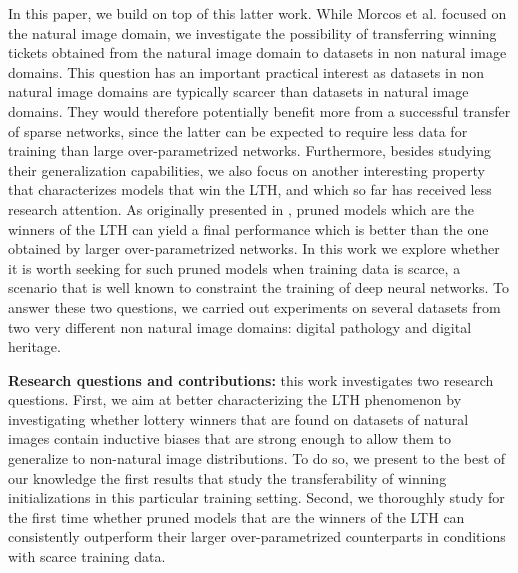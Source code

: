 In this paper, we build on top of this latter work. While Morcos et al. \cite{morcos2019one} focused on the natural image domain, we investigate the possibility of transferring winning tickets obtained from the natural image domain to datasets in non natural image domains. This question has an important practical interest as datasets in non natural image domains are typically scarcer than datasets in natural image domains. They would therefore potentially benefit more from a successful transfer of sparse networks, since the latter can be expected to require less data for training than large over-parametrized networks. Furthermore, besides studying their generalization capabilities, we also focus on another interesting property that characterizes models that win the LTH, and which so far has received less research attention. As originally presented in \cite{frankle2018lottery}, pruned models which are the winners of the LTH can yield a final performance which is better than the one obtained by larger over-parametrized networks. In this work we explore whether it is worth seeking for such pruned models when training data is scarce, a scenario that is well known to constraint the training of deep neural networks. To answer these two questions, we carried out experiments on several datasets from two very different non natural image domains: digital pathology and digital heritage.

\textbf{Research questions and contributions:} this work investigates two research questions. First, we aim at better characterizing the LTH phenomenon by investigating whether lottery winners that are found on datasets of natural images contain inductive biases that are strong enough to allow them to generalize to non-natural image distributions. To do so, we present to the best of our knowledge the first results that study the transferability of winning initializations in this particular training setting. Second, we thoroughly study for the first time whether pruned models that are the winners of the LTH can consistently outperform their larger over-parametrized counterparts in conditions with scarce training data.


